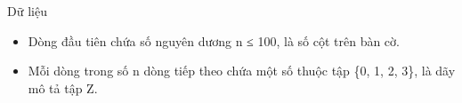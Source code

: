 Dữ liệu  
\begin{itemize}
	\item     Dòng đầu tiên chứa số nguyên dương n ≤ 100, là số cột trên bàn cờ.   
	\item     Mỗi dòng trong số n dòng tiếp theo chứa một số thuộc tập \{0, 1, 2, 3\}, là dãy mô tả tập Z.   
\end{itemize}